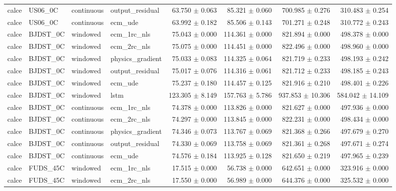 \begin{longtable}{llllrrrr}
calce & US06\_0C & continuous & output\_residual & 63.750 $\pm$ 0.063 & 85.321 $\pm$ 0.060 & 700.985 $\pm$ 0.276 & 310.483 $\pm$ 0.254 \\
calce & US06\_0C & continuous & ecm\_ude & 63.992 $\pm$ 0.182 & 85.506 $\pm$ 0.143 & 701.271 $\pm$ 0.248 & 310.772 $\pm$ 0.243 \\
calce & BJDST\_0C & windowed & ecm\_1rc\_nls & 75.043 $\pm$ 0.000 & 114.361 $\pm$ 0.000 & 821.894 $\pm$ 0.000 & 498.378 $\pm$ 0.000 \\
calce & BJDST\_0C & windowed & ecm\_2rc\_nls & 75.075 $\pm$ 0.000 & 114.451 $\pm$ 0.000 & 822.496 $\pm$ 0.000 & 498.960 $\pm$ 0.000 \\
calce & BJDST\_0C & windowed & physics\_gradient & 75.033 $\pm$ 0.083 & 114.325 $\pm$ 0.064 & 821.719 $\pm$ 0.233 & 498.193 $\pm$ 0.242 \\
calce & BJDST\_0C & windowed & output\_residual & 75.017 $\pm$ 0.076 & 114.316 $\pm$ 0.061 & 821.712 $\pm$ 0.233 & 498.185 $\pm$ 0.243 \\
calce & BJDST\_0C & windowed & ecm\_ude & 75.237 $\pm$ 0.180 & 114.457 $\pm$ 0.125 & 821.916 $\pm$ 0.210 & 498.401 $\pm$ 0.226 \\
calce & BJDST\_0C & windowed & lstm & 123.305 $\pm$ 8.149 & 157.763 $\pm$ 5.786 & 937.853 $\pm$ 10.306 & 584.042 $\pm$ 14.109 \\
calce & BJDST\_0C & continuous & ecm\_1rc\_nls & 74.378 $\pm$ 0.000 & 113.826 $\pm$ 0.000 & 821.627 $\pm$ 0.000 & 497.936 $\pm$ 0.000 \\
calce & BJDST\_0C & continuous & ecm\_2rc\_nls & 74.297 $\pm$ 0.000 & 113.845 $\pm$ 0.000 & 822.231 $\pm$ 0.000 & 498.434 $\pm$ 0.000 \\
calce & BJDST\_0C & continuous & physics\_gradient & 74.346 $\pm$ 0.073 & 113.767 $\pm$ 0.069 & 821.368 $\pm$ 0.266 & 497.679 $\pm$ 0.270 \\
calce & BJDST\_0C & continuous & output\_residual & 74.330 $\pm$ 0.069 & 113.758 $\pm$ 0.069 & 821.361 $\pm$ 0.268 & 497.671 $\pm$ 0.274 \\
calce & BJDST\_0C & continuous & ecm\_ude & 74.576 $\pm$ 0.184 & 113.925 $\pm$ 0.128 & 821.650 $\pm$ 0.219 & 497.965 $\pm$ 0.239 \\
calce & FUDS\_45C & windowed & ecm\_1rc\_nls & 17.515 $\pm$ 0.000 & 56.738 $\pm$ 0.000 & 642.651 $\pm$ 0.000 & 323.916 $\pm$ 0.000 \\
calce & FUDS\_45C & windowed & ecm\_2rc\_nls & 17.550 $\pm$ 0.000 & 56.989 $\pm$ 0.000 & 644.376 $\pm$ 0.000 & 325.532 $\pm$ 0.000 \\

\end{longtable}
